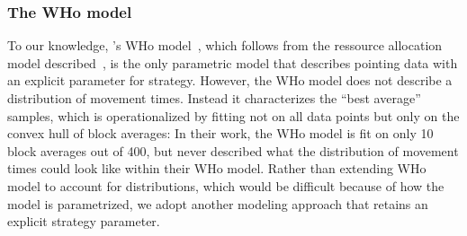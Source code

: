 \documentclass[acmlarge, manuscript,review]{acmart}
\begin{document}
\subsubsection{The WHo model\label{subsub:who}}
To our knowledge, \citeauthor{guiard2015}'s WHo model~\cite{guiard2015}, which follows from the ressource allocation model described~\cite{guiard2011b}, is the only parametric model that describes pointing data with an explicit parameter for strategy.
However, the WHo model does not describe a distribution of movement times. Instead it characterizes the ``best average'' samples, %
which is operationalized by fitting not on all data points but only on the convex hull of block averages: In their work, the WHo model is fit on only 10 block averages out of 400, but \citeauthor{guiard2015} never described what the distribution of movement times could look like within their WHo model.
Rather than extending WHo model to account for distributions, which would be difficult because of how the model is parametrized, we adopt another modeling approach that retains an explicit strategy parameter.
\end{document}

